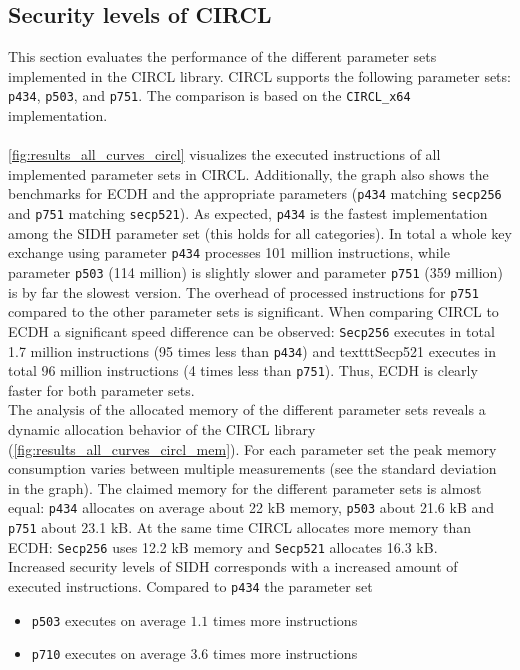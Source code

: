 \subsection{Security levels of CIRCL}\label{sec:levels_circl}
This section evaluates the performance of the different parameter sets implemented in the \gls{CIRCL} library. \gls{CIRCL} supports the following parameter sets: \texttt{p434}, \texttt{p503}, and \texttt{p751}. The comparison is based on the \texttt{CIRCL\_x64} implementation.\\\\
\autoref{fig:results_all_curves_circl} visualizes the executed instructions of all implemented parameter sets in \gls{CIRCL}. Additionally, the graph also shows the benchmarks for ECDH and the appropriate parameters (\texttt{p434} matching \texttt{secp256} and \texttt{p751} matching \texttt{secp521}). As expected, \texttt{p434} is the fastest implementation among the \gls{SIDH} parameter set (this holds for all categories). In total a whole key exchange using parameter \texttt{p434} processes 101 million instructions, while parameter \texttt{p503} (114 million) is slightly slower and parameter \texttt{p751} (359 million) is by far the slowest version. The overhead of processed instructions for \texttt{p751} compared to the other parameter sets is significant.
When comparing \gls{CIRCL} to \gls{ECDH} a significant speed difference can be observed: \texttt{Secp256} executes in total 1.7 million instructions (95 times less than \texttt{p434}) and texttt{Secp521} executes in total 96 million instructions (4 times less than \texttt{p751}). Thus, \gls{ECDH} is clearly faster for both parameter sets.\\
The analysis of the allocated memory of the different parameter sets reveals a dynamic allocation behavior of the \gls{CIRCL} library (\autoref{fig:results_all_curves_circl_mem}). For each parameter set the peak memory consumption varies between multiple measurements (see the standard deviation in the graph). The claimed memory for the different parameter sets is almost equal: \texttt{p434} allocates on average about 22 \gls{kB} memory, \texttt{p503} about 21.6 \gls{kB} and \texttt{p751} about 23.1 \gls{kB}. At the same time \gls{CIRCL} allocates more memory than \gls{ECDH}: \texttt{Secp256} uses 12.2 \gls{kB} memory  and \texttt{Secp521} allocates 16.3 \gls{kB}.\\

Increased security levels of \gls{SIDH} corresponds with a increased amount of executed instructions. Compared to \texttt{p434} the parameter set
\begin{itemize}
\itemsep0em 
\item \texttt{p503} executes on average $1.1$ times more instructions
\item \texttt{p710} executes on average $3.6$ times more instructions
\end{itemize}


